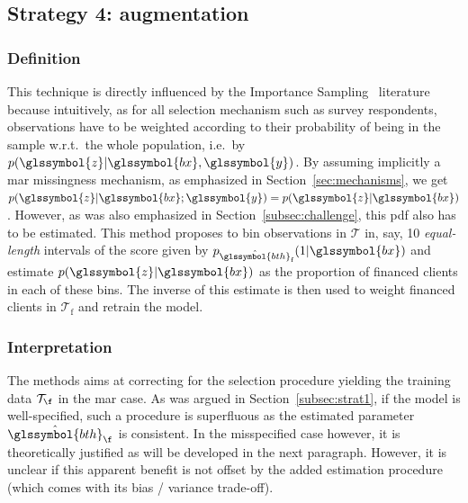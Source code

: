 \subsection{Strategy 4: augmentation} \label{subsec:augmentation}

\subsubsection{Definition}
This technique is directly influenced by the Importance Sampling~\cite{zadrozny2004learning} literature because intuitively, as for all selection mechanism such as survey respondents, observations have to be weighted according to their probability of being in the sample w.r.t.\ the whole population, i.e.\ by $p(\glssymbol{z} | \glssymbol{bx},\glssymbol{y})$. By assuming implicitly a \gls{mar} missingness mechanism, as emphasized in Section~\ref{sec:mechanisms}, we get $p(\glssymbol{z} | \glssymbol{bx}; \glssymbol{y}) = p(\glssymbol{z} | \glssymbol{bx})$. However, as was also emphasized in Section~\ref{subsec:challenge}, this \gls{pdf} also has to be estimated. This method proposes to bin observations in $\mathcal{T}$ in, say, 10 \textit{equal-length} intervals of the \gls{score} given by $p_{\hat{\glssymbol{bth}}_\text{f}}(1 | \glssymbol{bx})$ and estimate $p(\glssymbol{z} | \glssymbol{bx})$ as the proportion of financed clients in each of these bins. The inverse of this estimate is then used to weight financed clients in $\mathcal{T}_{\text{f}}$ and retrain the model.

\subsubsection{Interpretation}
The methods aims at correcting for the selection procedure yielding the training data $\mathcal{T}_{\f}$ in the \gls{mar} case. As was argued in Section~\ref{subsec:strat1}, if the model is well-specified, such a procedure is superfluous as the estimated parameter $\hat{\glssymbol{bth}}_{\f}$ is consistent. In the misspecified case however, it is theoretically justified as will be developed in the next paragraph. However, it is unclear if this apparent benefit is not offset by the added estimation procedure (which comes with its bias / variance trade-off).

